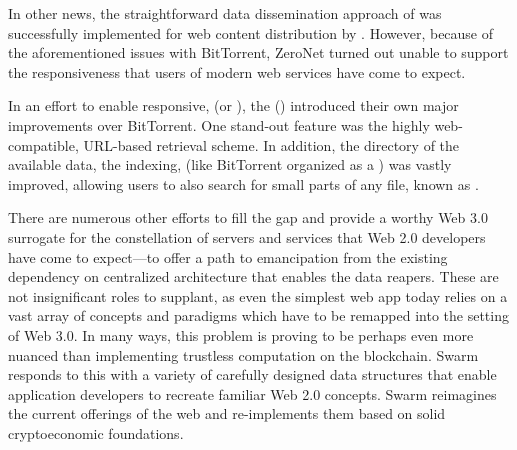 In other news, the straightforward data dissemination approach of  was successfully implemented for web content distribution by  \cite{zeronet}. However, because of the aforementioned issues with BitTorrent, ZeroNet turned out unable to support the responsiveness that users of modern web services have come to expect.

In an effort to enable responsive,  (or ), the  () \cite{ipfs2014}  introduced their own major improvements over BitTorrent. One stand-out feature was the highly web-compatible, URL-based retrieval scheme. In addition, the directory of the available data, the indexing, (like BitTorrent organized as a ) was vastly improved, allowing users to also search for small parts of any file, known as .

There are numerous other efforts to fill the gap and provide a worthy Web 3.0 surrogate for the constellation of servers and services that Web 2.0 developers have come to expect—to offer a path to emancipation from the existing dependency on centralized architecture that enables the data reapers. These are not insignificant roles to supplant, as even the simplest web app today relies on a vast array of concepts and paradigms which have to be remapped into the  setting of Web 3.0. In many ways, this problem is proving to be perhaps even more nuanced than implementing trustless computation on the blockchain. Swarm responds to this with a variety of carefully designed data structures that enable application developers to recreate familiar Web 2.0 concepts. Swarm reimagines the current offerings of the web and re-implements them based on solid cryptoeconomic foundations.

